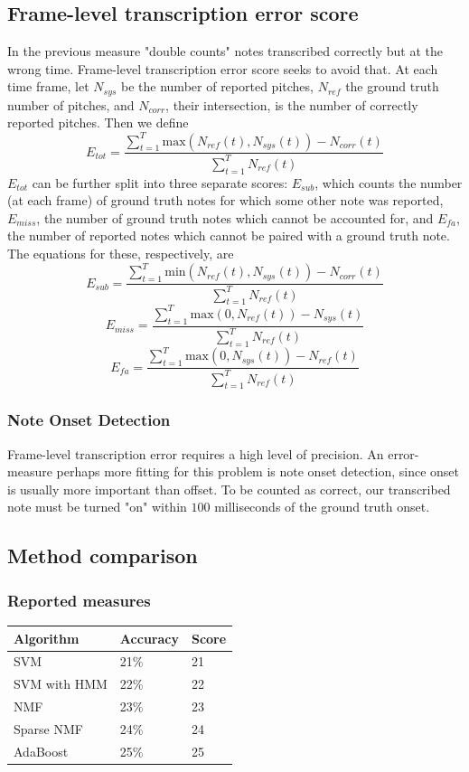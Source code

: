 \documentclass[5p]{elsarticle}
\begin{document}
\subsection{Frame-level transcription error score}
In the previous measure "double counts" notes transcribed correctly but at the wrong time.  Frame-level transcription error score seeks to avoid that.
At each time frame, let $N_{sys}$ be the number of reported pitches, $N_{ref}$ the ground truth number of pitches, and $N_{corr}$, their intersection, is the number of correctly reported pitches.  Then we define 
$$E_{tot}=\frac{\sum_{t=1}^T \text{max}(N_{ref}(t),N_{sys}(t))-N_{corr}(t)}{\sum_{t=1}^T N_{ref}(t)}$$
$E_{tot}$ can be further split into three separate scores: $E_{sub}$, which counts the number (at each frame) of ground truth notes for which some other note was reported, $E_{miss}$, the number of ground truth notes which cannot be accounted for, and $E_{fa}$, the number of reported notes which cannot be paired with a ground truth note.  The equations for these, respectively, are 
$$E_{sub}=\frac{\sum_{t=1}^T \text{min}(N_{ref}(t),N_{sys}(t))-N_{corr}(t)}{\sum_{t=1}^T N_{ref}(t)}$$
$$E_{miss}=\frac{\sum_{t=1}^T \text{max}(0,N_{ref}(t))-N_{sys}(t)}{\sum_{t=1}^T N_{ref}(t)}$$
$$E_{fa}=\frac{\sum_{t=1}^T \text{max}(0,N_{sys}(t))-N_{ref}(t)}{\sum_{t=1}^T N_{ref}(t)}$$

\subsubsection{Note Onset Detection}
Frame-level transcription error requires a high level of precision.  An error-measure perhaps more fitting for this problem is note onset detection, since onset is usually more important than offset.  To be counted as correct, our transcribed note must be turned "on" within $100$ milliseconds of the ground truth onset.
\subsection{Method comparison}

\subsubsection{Reported measures}
\begin{center}
\begin{tabular}{|l|l|l|}
\hline
Algorithm & Accuracy & Score \\ \hline
SVM & 21\% & 21 \\ \hline
SVM with HMM & 22\% & 22 \\ \hline
NMF & 23\% & 23 \\ \hline
Sparse NMF & 24\% & 24 \\ \hline
AdaBoost & 25\% & 25 \\ \hline
\end{tabular}
\end{center}
\end{document}
